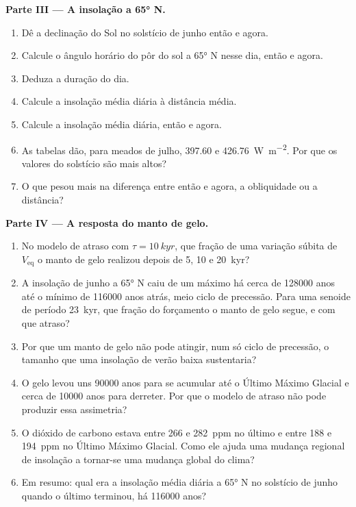 \begin{problem}
\medskip\noindent\textbf{Parte III --- A insolação a \ang{65} N.}
\begin{enumerate}[resume]
  \item Dê a declinação do Sol no solstício de junho então e agora.
  \item Calcule o ângulo horário do pôr do sol a \ang{65} N nesse dia, então e agora.
  \item Deduza a duração do dia.
  \item Calcule a insolação média diária à distância média.
  \item Calcule a insolação média diária, então e agora.
  \item As tabelas dão, para meados de julho, 397.60 e \qty{426.76}{W.m^{-2}}. Por que os valores do
        solstício são mais altos?
  \item O que pesou mais na diferença entre então e agora, a obliquidade ou a distância?
\end{enumerate}

\medskip\noindent\textbf{Parte IV --- A resposta do manto de gelo.}
\begin{enumerate}[resume]
  \item No modelo de atraso com $\tau = \qty{10}{kyr}$, que fração de uma variação súbita de
        $V_{\mathrm{eq}}$ o manto de gelo realizou depois de 5, 10 e \qty{20}{kyr}?
  \item A insolação de junho a \ang{65} N caiu de um máximo há cerca de \num{128000} anos até o
        mínimo de \num{116000} anos atrás, meio ciclo de precessão. Para uma senoide de período
        \qty{23}{kyr}, que fração do forçamento o manto de gelo segue, e com que atraso?
  \item Por que um manto de gelo não pode atingir, num só ciclo de precessão, o tamanho que uma insolação de verão
        baixa sustentaria?
  \item O gelo levou uns \num{90000} anos para se acumular até o Último Máximo Glacial e cerca de
        \num{10000} anos para derreter. Por que o modelo de atraso não pode produzir essa assimetria?
  \item O dióxido de carbono estava entre 266 e \qty{282}{ppm} no último  e entre
        188 e \qty{194}{ppm} no Último Máximo Glacial. Como ele ajuda uma mudança regional de
        insolação a tornar-se uma mudança global do clima?
  \item Em resumo: qual era a insolação média diária a \ang{65} N no solstício de junho quando o
        último  terminou, há \num{116000} anos?
\end{enumerate}
\end{problem}
